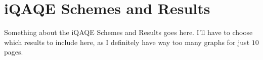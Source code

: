 \section{iQAQE Schemes and Results}
\label{sec:concl}


Something about the iQAQE Schemes and Results goes here. I'll have to choose which results to include here, as I definitely have way too many graphs for just $10$ pages.